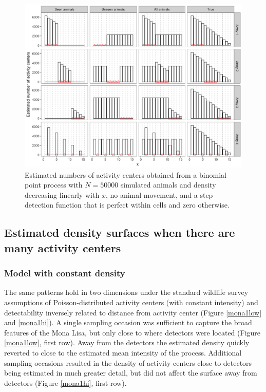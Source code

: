 \documentclass[a4paper,12pt]{article}
\begin{document}
\begin{figure}[htbp]
\centering
\includegraphics[width=1\textwidth]{binompp_inf.png}
\caption{Estimated numbers of activity centers obtained from a binomial point process with $N=50000$ simulated animals and density decreasing linearly with $x$, no animal movement, and a step detection function that is perfect within cells and zero otherwise.}
\label{binom}
\end{figure}

\subsection{Estimated density surfaces when there are many activity centers}

\subsubsection{Model with constant density}
The same patterns hold in two dimensions under the standard wildlife survey assumptions of Poisson-distributed activity centers (with constant intensity) and detectability inversely related to distance from activity center (Figure \ref{mona1low} and \ref{mona1hi}). A single sampling occasion was sufficient to capture the broad features of the Mona Lisa, but only close to where detectors were located (Figure \ref{mona1low}, first row). Away from the detectors the estimated density quickly reverted to close to the estimated mean intensity of the process. Additional sampling occasions resulted in the density of activity centers close to detectors being estimated in much greater detail, but did not affect the surface away from detectors (Figure \ref{mona1hi}, first row). 
\end{document}

